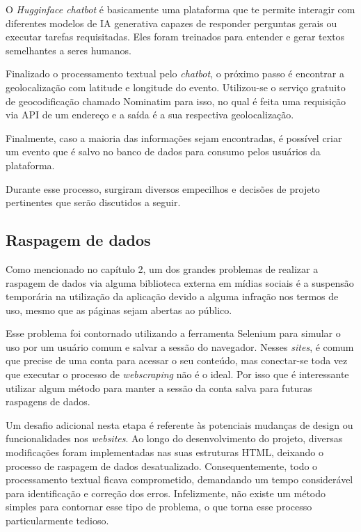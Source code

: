 O \textit{Hugginface chatbot} é basicamente uma plataforma que te permite
interagir com diferentes modelos de \ac{IA} generativa capazes de responder
perguntas gerais ou executar tarefas requisitadas. Eles foram treinados para
entender e gerar textos semelhantes a seres humanos.

Finalizado o processamento textual pelo \textit{chatbot}, o próximo passo é
encontrar a geolocalização com latitude e longitude do evento. Utilizou-se o
serviço gratuito de geocodificação chamado Nominatim para isso, no qual é feita
uma requisição via \acs{API} de um endereço e a saída é a sua respectiva
geolocalização.

Finalmente, caso a maioria das informações sejam encontradas, é possível criar
um evento que é salvo no banco de dados para consumo pelos usuários da
plataforma.

Durante esse processo, surgiram diversos empecilhos e decisões de projeto
pertinentes que serão discutidos a seguir.

\subsection{\textbf{Raspagem de dados}}

Como mencionado no capítulo 2, um dos grandes problemas de realizar a raspagem
de dados via alguma biblioteca externa em mídias sociais é a suspensão
temporária na utilização da aplicação devido a alguma infração nos termos de
uso, mesmo que as páginas sejam abertas ao público.

Esse problema foi contornado utilizando a ferramenta Selenium para simular o
uso por um usuário comum e salvar a sessão do navegador. Nesses \textit{sites},
é comum que precise de uma conta para acessar o seu conteúdo, mas conectar-se
toda vez que executar o processo de \textit{webscraping} não é o ideal. Por
isso que é interessante utilizar algum método para manter a sessão da conta
salva para futuras raspagens de dados.

Um desafio adicional nesta etapa é referente às potenciais mudanças de design
ou funcionalidades nos \textit{websites}. Ao longo do desenvolvimento do
projeto, diversas modificações foram implementadas nas suas estruturas HTML,
deixando o processo de raspagem de dados desatualizado. Consequentemente, todo
o processamento textual ficava comprometido, demandando um tempo considerável
para identificação e correção dos erros. Infelizmente, não existe um método
simples para contornar esse tipo de problema, o que torna esse processo
particularmente tedioso.

